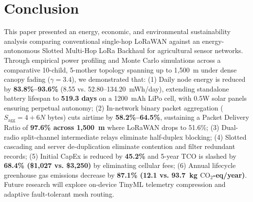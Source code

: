 \documentclass[conference]{IEEEtran}
\begin{document}
\FloatBarrier

\section{Conclusion}
\label{sec:conclusion}
This paper presented an energy, economic, and environmental sustainability analysis comparing conventional single-hop LoRaWAN against an energy-autonomous Slotted Multi-Hop LoRa Backhaul for agricultural sensor networks. Through empirical power profiling and Monte Carlo simulations across a comparative 10-child, 5-mother topology spanning up to 1,500~m under dense canopy fading ($\gamma = 3.4$), we demonstrated that: (1) Daily node energy is reduced by \textbf{83.8\%--93.6\%} (8.55 vs. 52.80--134.20~mWh/day), extending standalone battery lifespan to \textbf{519.3 days} on a 1200~mAh LiPo cell, with 0.5W solar panels ensuring perpetual autonomy; (2) In-network binary packet aggregation ($S_{\text{agg}} = 4 + 6N$ bytes) cuts airtime by \textbf{58.2\%--64.5\%}, sustaining a Packet Delivery Ratio of \textbf{97.6\% across 1,500~m} where LoRaWAN drops to 51.6\%; (3) Dual-radio split-channel intermediate relays eliminate half-duplex blocking; (4) Slotted cascading and server de-duplication eliminate contention and filter redundant records; (5) Initial CapEx is reduced by \textbf{45.2\%} and 5-year TCO is slashed by \textbf{68.4\% (\$1,027 vs. \$3,250)} by eliminating cellular fees; (6) Annual lifecycle greenhouse gas emissions decrease by \textbf{87.1\% (12.1 vs. 93.7~kg $\text{CO}_2$-eq/year)}. Future research will explore on-device TinyML telemetry compression and adaptive fault-tolerant mesh routing.
\end{document}
